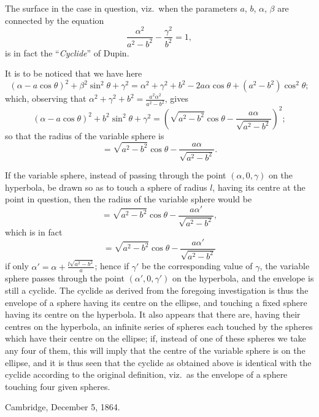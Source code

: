 \documentclass[11pt,a4paper]{article}
\theoremstyle{plain}
\begin{document}
The surface in the case in question, viz.\ when the parameters $a$, $b$, $\alpha$, $\beta$ are connected by the equation
\[
\frac{\alpha^2}{a^2 - b^2} - \frac{\gamma^2}{b^2} = 1,
\]
is in fact the ``\textit{Cyclide}'' of Dupin.

It is to be noticed that we have here
\[
(\alpha - a\cos\theta)^2 + \beta^2\sin^2\theta + \gamma^2 = \alpha^2 + \gamma^2 + b^2 - 2a\alpha\cos\theta + (a^2 - b^2)\cos^2\theta;
\]
which, observing that $\alpha^2 + \gamma^2 + b^2 = \frac{a^2\alpha^2}{a^2 - b^2}$, gives
\[
(\alpha - a\cos\theta)^2 + b^2\sin^2\theta + \gamma^2 = (\sqrt{a^2 - b^2}\cos\theta - \frac{a\alpha}{\sqrt{a^2 - b^2}})^2;
\]
so that the radius of the variable sphere is
\[
= \sqrt{a^2 - b^2}\cos\theta - \frac{a\alpha}{\sqrt{a^2 - b^2}}.
\]

If the variable sphere, instead of passing through the point $(\alpha, 0, \gamma)$ on the hyperbola, be drawn so as to touch a sphere of radius $l$, having its centre at the point in question, then the radius of the variable sphere would be
\[
= \sqrt{a^2 - b^2}\cos\theta - \frac{a\alpha'}{\sqrt{a^2 - b^2}},
\]
which is in fact
\[
= \sqrt{a^2 - b^2}\cos\theta - \frac{a\alpha'}{\sqrt{a^2 - b^2}}
\]
if only $\alpha' = \alpha + \frac{l\sqrt{a^2 - b^2}}{a}$; hence if $\gamma'$ be the corresponding value of $\gamma$, the variable sphere passes through the point $(\alpha', 0, \gamma')$ on the hyperbola, and the envelope is still a cyclide. The cyclide as derived from the foregoing investigation is thus the envelope of a sphere having its centre on the ellipse, and touching a fixed sphere having its centre on the hyperbola. It also appears that there are, having their centres on the hyperbola, an infinite series of spheres each touched by the spheres which have their centre on the ellipse; if, instead of one of these spheres we take any four of them, this will imply that the centre of the variable sphere is on the ellipse, and it is thus seen that the cyclide as obtained above is identical with the cyclide according to the original definition, viz.\ as the envelope of a sphere touching four given spheres.

\begin{flushright}
Cambridge, December 5, 1864.
\end{flushright}

\vspace{1cm}

\end{document}

